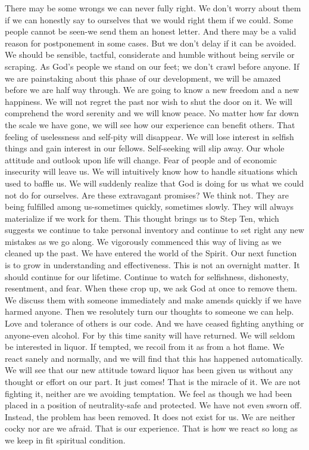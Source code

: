 \begin{biblechapter}
There may be some wrongs we can never fully right.  We don't worry about them if we can honestly say to ourselves that we would right them if we could.  Some people cannot be seen-we send them an honest letter.  And there may be a valid reason for postponement in some cases.  But we don't delay if it can be avoided.  We should be sensible, tactful, considerate and humble without being servile or scraping.  As God's people we stand on our feet; we don't crawl before anyone.
If we are painstaking about this phase of our development, we will be amazed before we are half way through.  We are going to know a new freedom and a new happiness.  We will not regret the past nor wish to shut the door on it.  We will comprehend the word serenity and we will know peace.  No matter how far down the scale we have gone, we will see how our experience can benefit others.  That feeling of uselessness and self-pity will disappear.  We will lose interest in selfish things and gain interest in our fellows.  Self-seeking will slip away.  Our whole attitude and outlook upon life will change.  Fear of people and of economic insecurity will leave us.  We will intuitively know how to handle situations which used to baffle us.  We will suddenly realize that God is doing for us what we could not do for ourselves.
Are these extravagant promises?  We think not.  They are being fulfilled among us-sometimes quickly, sometimes slowly.  They will always materialize if we work for them.
This thought brings us to Step Ten, which suggests we continue to take personal inventory and continue to set right any new mistakes as we go along.  We vigorously commenced this way of living as we cleaned up the past.  We have entered the world of the Spirit.  Our next function is to grow in understanding and effectiveness.  This is not an overnight matter.  It should continue for our lifetime.  Continue to watch for selfishness, dishonesty, resentment, and fear.  When these crop up, we ask God at once to remove them.  We discuss them with someone immediately and make amends quickly if we have harmed anyone.  Then we resolutely turn our thoughts to someone we can help.  Love and tolerance of others is our code.
And we have ceased fighting anything or anyone-even alcohol.  For by this time sanity will have returned.  We will seldom be interested in liquor.  If tempted, we recoil from it as from a hot flame.  We react sanely and normally, and we will find that this has happened automatically.  We will see that our new attitude toward liquor has been given us without any thought or effort on our part.  It just comes!  That is the miracle of it.  We are not fighting it, neither are we avoiding temptation.  We feel as though we had been placed in a position of neutrality-safe and protected.  We have not even sworn off.  Instead, the problem has been removed.  It does not exist for us.  We are neither cocky nor are we afraid.  That is our experience.  That is how we react so long as we keep in fit spiritual condition.

\end{biblechapter}
